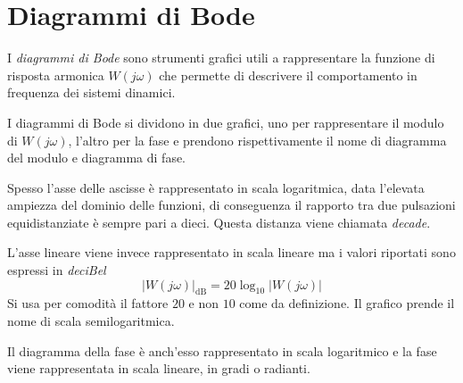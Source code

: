 
\section{Diagrammi di Bode}
I \textit{diagrammi di Bode} sono strumenti grafici utili a rappresentare la
funzione di risposta armonica $W(j\omega)$ che permette di descrivere il
comportamento in frequenza dei sistemi dinamici.

I diagrammi di Bode si dividono in due grafici, uno per rappresentare il modulo
di $W(j\omega)$, l'altro per la fase e prendono rispettivamente il nome di
diagramma del modulo e diagramma di fase.

Spesso l'asse delle ascisse è rappresentato in scala logaritmica, data
l'elevata ampiezza del dominio delle funzioni, di conseguenza il rapporto tra
due pulsazioni equidistanziate è sempre pari a dieci.
Questa distanza viene chiamata \textit{decade}.

L'asse lineare viene invece rappresentato in scala lineare ma i valori
riportati sono espressi in \textit{deciBel}
$$
|W(j\omega)|_{\si{\deci\bel}} = 20\log_{10}|W(j\omega)|
$$
Si usa per comodità il fattore $20$ e non $10$ come da definizione.
Il grafico prende il nome di scala semilogaritmica.
\begin{figure}[h]
\centering
{}
\end{figure}

Il diagramma della fase è anch'esso rappresentato in scala logaritmico e la
fase viene rappresentata in scala lineare, in gradi o radianti.


